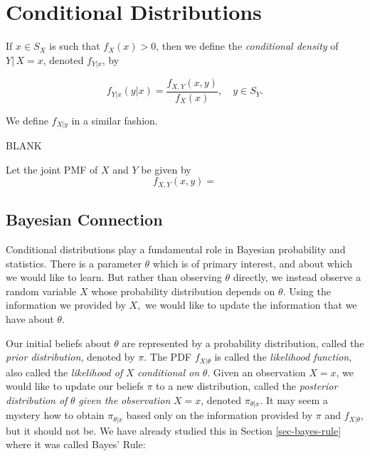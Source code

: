 \documentclass[]{book}
\numberwithin{equation}{chapter}
\numberwithin{figure}{chapter}
\theoremstyle{plain}
\theoremstyle{definition}
\theoremstyle{remark}
\theoremstyle{definition}
\theoremstyle{definition}
\theoremstyle{remark}
\let\BeginKnitrBlock\begin \let\EndKnitrBlock\end
\begin{document}
\section{Conditional Distributions}\label{sec-conditional-distributions}

If \(x\in S_{X}\) is such that \(f_{X}(x)>0\), then we define the
\emph{conditional density} of \(Y|\, X=x\), denoted \(f_{Y|x}\), by

\begin{equation}
f_{Y|x}(y|x)=\frac{f_{X,Y}(x,y)}{f_{X}(x)},\quad y\in S_{Y}.
\end{equation}

We define \(f_{X|y}\) in a similar fashion.

BLANK

\bigskip

\BeginKnitrBlock{example}
\protect\hypertarget{ex:unnamed-chunk-308}{}{\label{ex:unnamed-chunk-308}}Let
the joint PMF of \(X\) and \(Y\) be given by \[
f_{X,Y}(x,y) =
\]
\EndKnitrBlock{example}

\subsection{Bayesian Connection}\label{bayesian-connection}

Conditional distributions play a fundamental role in Bayesian
probability and statistics. There is a parameter \(\theta\) which is of
primary interest, and about which we would like to learn. But rather
than observing \(\theta\) directly, we instead observe a random variable
\(X\) whose probability distribution depends on \(\theta\). Using the
information we provided by \(X,\) we would like to update the
information that we have about \(\theta\).

Our initial beliefs about \(\theta\) are represented by a probability
distribution, called the \emph{prior distribution}, denoted by \(\pi\).
The PDF \(f_{X|\theta}\) is called the \emph{likelihood function}, also
called the \emph{likelihood of} \(X\) \emph{conditional on} \(\theta\).
Given an observation \(X=x\), we would like to update our beliefs
\(\pi\) to a new distribution, called the \emph{posterior distribution
of} \(\theta\) \emph{given the observation} \(X=x\), denoted
\(\pi_{\theta|x}\). It may seem a mystery how to obtain
\(\pi_{\theta|x}\) based only on the information provided by \(\pi\) and
\(f_{X|\theta}\), but it should not be. We have already studied this in
Section \ref{sec-bayes-rule} where it was called Bayes' Rule:
\end{document}
